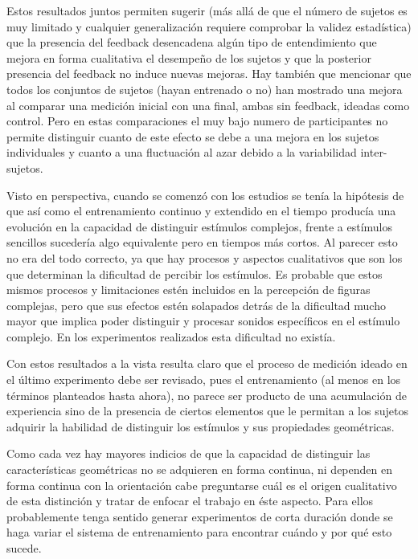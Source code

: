\documentclass{article}
\numberwithin{figure}{section}
\begin{document}
    Estos resultados juntos permiten sugerir (más allá de que el número de sujetos es muy limitado y cualquier generalización requiere comprobar la validez estadística) que la presencia del feedback desencadena algún tipo de entendimiento que mejora en forma cualitativa el desempeño de los sujetos y que la posterior presencia del feedback no induce nuevas mejoras. Hay también que mencionar que todos los conjuntos de sujetos (hayan entrenado o no) han mostrado una mejora al comparar una medición inicial con una final, ambas sin feedback, ideadas como control. Pero en estas comparaciones el muy bajo numero de participantes no permite distinguir cuanto de este efecto se debe a una mejora en los sujetos individuales y cuanto a una fluctuación al azar debido a la variabilidad inter-sujetos. 
    
    Visto en perspectiva, cuando se comenzó con los estudios se tenía la hipótesis de que así como el entrenamiento continuo y extendido en el tiempo producía una evolución en la capacidad de distinguir estímulos complejos, frente a estímulos sencillos sucedería algo equivalente pero en tiempos más cortos. Al parecer esto no era del todo correcto, ya que hay procesos y aspectos cualitativos que son los que determinan la dificultad de percibir los estímulos. Es probable que estos mismos procesos y limitaciones estén incluidos en la percepción de figuras complejas, pero que sus efectos estén solapados detrás de la dificultad mucho mayor que implica poder distinguir y procesar sonidos específicos en el estímulo complejo. En los experimentos realizados esta dificultad no existía.
    
    Con estos resultados a la vista resulta claro que el proceso de medición ideado en el último experimento debe ser revisado, pues el entrenamiento (al menos en los términos planteados hasta ahora), no parece ser producto de una acumulación de experiencia sino de la presencia de ciertos elementos que le permitan a los sujetos adquirir la habilidad de distinguir los estímulos y sus propiedades geométricas. 
    
    Como cada vez hay mayores indicios de que la capacidad de distinguir las características geométricas no se adquieren en forma continua, ni dependen en forma continua con la orientación cabe preguntarse cuál es el origen cualitativo de esta distinción y tratar de enfocar el trabajo en éste aspecto. Para ellos probablemente tenga sentido generar experimentos de corta duración donde se haga variar el sistema de entrenamiento para encontrar cuándo y por qué esto sucede. 
    
\end{document}
